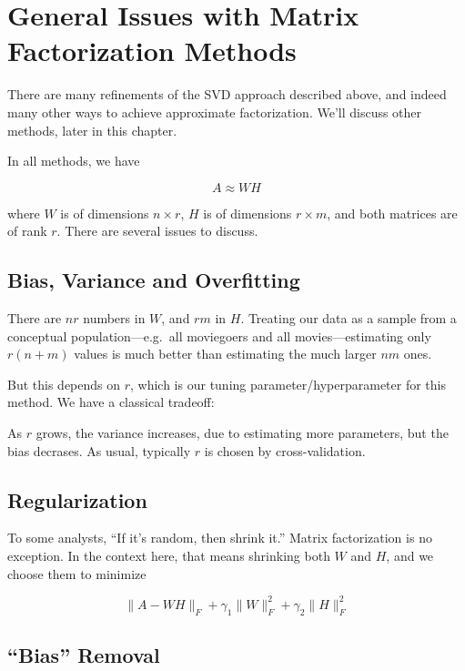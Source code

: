 \section{General Issues with Matrix Factorization Methods}  

There are many refinements of the SVD approach described above, and
indeed many other ways to achieve approximate factorization.  We'll
discuss other methods, later in this chapter.  

In all methods, we have

\begin{equation}
A \approx WH
\end{equation}

where $W$ is of dimensions $n \times r$,
$H$ is of dimensions $r \times m$, and both matrices are of rank $r$.
There are several issues to discuss.

\subsection{Bias, Variance and Overfitting}

There are $nr$ numbers in $W$, and $rm$ in $H$.  Treating our data as a
sample from a conceptual population---e.g.\ all moviegoers and all
movies---estimating only $r(n+m)$ values is much better than estimating
the much larger $nm$ ones.

But this depends on $r$, which is our tuning parameter/hyperparameter
for this method.  We have a classical tradeoff:

As $r$ grows, the variance increases, due to estimating more parameters,
but the bias decrases.  As usual, typically $r$ is chosen by
cross-validation.

\subsection{Regularization}

To some analysts, ``If it's random, then shrink it.''  Matrix
factorization is no exception.  In the context here, that means
shrinking both $W$ and $H$, and we choose them to minimize

\begin{equation}
\|A - WH\|_F + \gamma_1 \|W\|_F^2 + \gamma_2 \|H\|_F^2
\end{equation}

\subsection{``Bias'' Removal}

